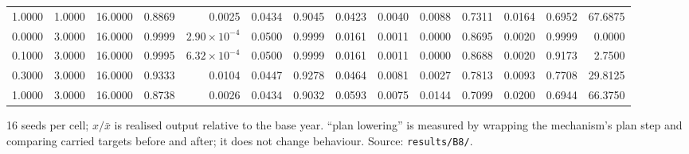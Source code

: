 \begin{table}[htbp]
\begin{tabular}{lrrrrrrrrrrrrr}
1.0000 & 1.0000 & 16.0000 & 0.8869 & 0.0025 & 0.0434 & 0.9045 & 0.0423 & 0.0040 & 0.0088 & 0.7311 & 0.0164 & 0.6952 & 67.6875 \\
0.0000 & 3.0000 & 16.0000 & 0.9999 & $2.90\times10^{-4}$ & 0.0500 & 0.9999 & 0.0161 & 0.0011 & 0.0000 & 0.8695 & 0.0020 & 0.9999 & 0.0000 \\
0.1000 & 3.0000 & 16.0000 & 0.9995 & $6.32\times10^{-4}$ & 0.0500 & 0.9999 & 0.0161 & 0.0011 & 0.0000 & 0.8688 & 0.0020 & 0.9173 & 2.7500 \\
0.3000 & 3.0000 & 16.0000 & 0.9333 & 0.0104 & 0.0447 & 0.9278 & 0.0464 & 0.0081 & 0.0027 & 0.7813 & 0.0093 & 0.7708 & 29.8125 \\
1.0000 & 3.0000 & 16.0000 & 0.8738 & 0.0026 & 0.0434 & 0.9032 & 0.0593 & 0.0075 & 0.0144 & 0.7099 & 0.0200 & 0.6944 & 66.3750 \\
\bottomrule
\end{tabular}
\par\smallskip
\begin{minipage}{\linewidth}\footnotesize 16 seeds per cell; $x/\bar x$ is realised output relative to the base year. ``plan lowering'' is measured by wrapping the mechanism's plan step and comparing carried targets before and after; it does not change behaviour. Source: \texttt{results/B8/}.\end{minipage}
\end{table}
